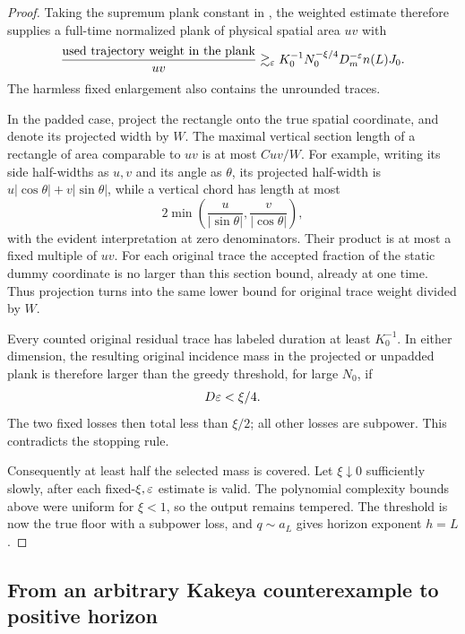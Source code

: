 \begin{proof}
Taking the supremum plank constant in
, the weighted estimate
therefore supplies a full-time normalized plank of
physical spatial area \(uv\) with
\begin{equation}
 \frac{\hbox{used trajectory weight in the plank}}{uv}
 \gtrsim_\varepsilon
 K_0^{-1}N_0^{-\xi/4}D_m^{-\varepsilon}n(L)J_0.
 \label{a01:greedy-heavy-plank}
\end{equation}
The harmless fixed enlargement also contains the
unrounded traces.

In the padded case, project the rectangle onto the true
spatial coordinate, and denote its projected width by
\(W\).  The maximal vertical section length of a
rectangle of area comparable to \(uv\) is at most
\(Cuv/W\).
For example, writing its side half-widths as \(u,v\)
and its angle as \(\theta\), its projected half-width is
\(u|\cos\theta|+v|\sin\theta|\), while a vertical chord
has length at most
\[
 2\min\!\left(\frac{u}{|\sin\theta|},
             \frac{v}{|\cos\theta|}\right),
\]
with the evident interpretation at zero denominators.
Their product is at most a fixed multiple of \(uv\).
For each original trace the accepted fraction of the
static dummy coordinate is no larger than this
section bound, already at one time.
Thus projection turns  into
the same lower bound for original trace weight divided
by \(W\).

Every counted original residual trace has labeled
duration at least \(K_0^{-1}\).  In either dimension,
the resulting original incidence mass in the projected
or unpadded plank is therefore larger than the greedy
threshold, for large \(N_0\), if
\[
 D\varepsilon<\xi/4.
\]
The two fixed losses then total less than \(\xi/2\);
all other losses are subpower.
This contradicts the stopping rule.

Consequently at least half the selected mass is covered.
Let \(\xi\downarrow0\) sufficiently slowly, after each
fixed-\(\xi,\varepsilon\) estimate is valid.
The polynomial complexity bounds above were uniform
for \(\xi<1\), so the output remains tempered.
The threshold  is now the
true floor with a subpower loss, and \(q\sim a_L\)
gives horizon exponent \(h=L\).
\end{proof}

\subsection{From an arbitrary Kakeya counterexample to positive horizon}

